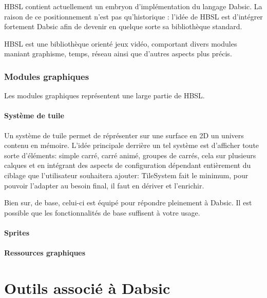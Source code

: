 \documentclass[a5paper, 12pt]{book}
\begin{document}
HBSL contient actuellement un embryon d'implémentation
du langage Dabsic. La raison de ce positionnement n'est
pas qu'historique : l'idée de HBSL est d'intégrer fortement
Dabsic afin de devenir en quelque sorte sa bibliothèque
standard.

HBSL est une bibliothèque orienté jeux vidéo, comportant
divers modules maniant graphisme, temps, réseau ainsi
que d'autres aspects plus précis.

\section{Modules graphiques}

Les modules graphiques représentent une large
partie de HBSL.

\subsection{Système de tuile}

Un système de tuile permet de réprésenter sur une
surface en 2D un univers contenu en mémoire. L'idée
principale derrière un tel système est d'afficher
toute sorte d'éléments: simple carré, carré animé,
groupes de carrés, cela sur plusieurs calques et
en intégrant des aspects de configuration dépendant
entièrement du ciblage que l'utilisateur souhaitera
ajouter: TileSystem fait le minimum, pour pouvoir
l'adapter au besoin final, il faut en dériver et
l'enrichir.

Bien sur, de base, celui-ci est équipé pour répondre
pleinement à Dabsic. Il est possible que les fonctionnalités
de base suffisent à votre usage.

\subsection{Sprites}

\subsection{Ressources graphiques}


\part{Outils associé à Dabsic}
\end{document}
